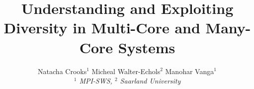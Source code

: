 

\newif \ifDraft\Drafttrue

\ifDraft
  \newcommand{\Comment}[1]{\textbf{\textsl{#1}}}
\else
  \newcommand{\Comment}[1]{\relax}
\fi

\newcommand{\gernot}[1]{\Comment{#1 [gernot]}}


\title{\vspace{-0.8cm}\textbf{
Understanding and Exploiting Diversity in Multi-Core and Many-Core Systems
}}

\author{
Natacha Crooks$^1$ \quad
Micheal Walter-Echols$^2$ \quad
Manohar Vanga$^1$
\\ \emph{$^1$ MPI-SWS, $^2$ Saarland University}
}
\date{\vspace{-12pt}}




\maketitle








\fontsize{8}{8.2}
\selectfont


\normalsize

%

